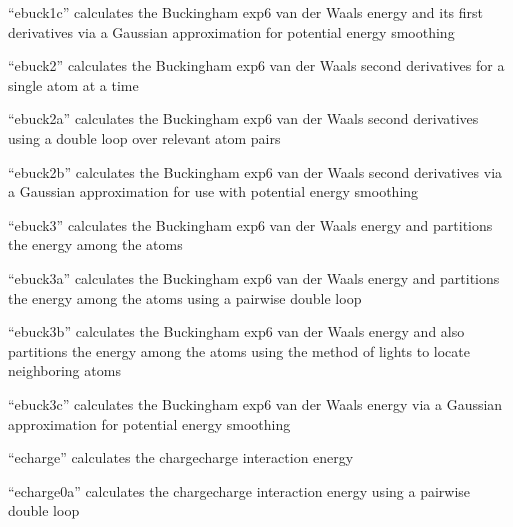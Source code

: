 \documentclass[letterpaper,11pt,english]{sphinxmanual}
\begin{document}

“ebuck1c” calculates the Buckingham exp\sphinxhyphen{}6 van der Waals energy and its first derivatives via a Gaussian approximation for potential energy smoothing


“ebuck2” calculates the Buckingham exp\sphinxhyphen{}6 van der Waals second derivatives for a single atom at a time


“ebuck2a” calculates the Buckingham exp\sphinxhyphen{}6 van der Waals second derivatives using a double loop over relevant atom pairs


“ebuck2b” calculates the Buckingham exp\sphinxhyphen{}6 van der Waals second derivatives via a Gaussian approximation for use with potential energy smoothing


“ebuck3” calculates the Buckingham exp\sphinxhyphen{}6 van der Waals energy and partitions the energy among the atoms


“ebuck3a” calculates the Buckingham exp\sphinxhyphen{}6 van der Waals energy and partitions the energy among the atoms using a pairwise double loop


“ebuck3b” calculates the Buckingham exp\sphinxhyphen{}6 van der Waals energy and also partitions the energy among the atoms using the method of lights to locate neighboring atoms


“ebuck3c” calculates the Buckingham exp\sphinxhyphen{}6 van der Waals energy via a Gaussian approximation for potential energy smoothing


“echarge” calculates the charge\sphinxhyphen{}charge interaction energy


“echarge0a” calculates the charge\sphinxhyphen{}charge interaction energy using a pairwise double loop

\end{document}
